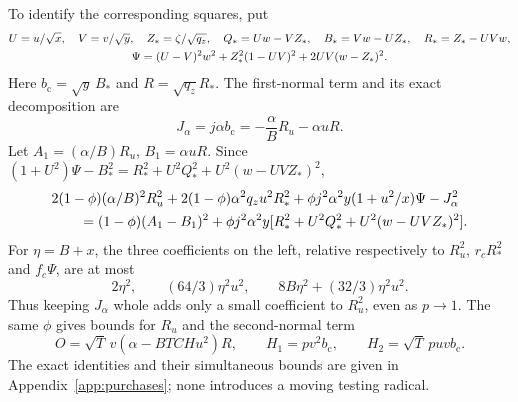 \documentclass[10pt]{article}
\newcommand{\bc}{b_{\mathrm c}}
\newcommand{\Zc}{Z_*}
\newcommand{\Qh}{Q_*}
\newcommand{\Rh}{R_*}
\newcommand{\Bh}{B_*}
\newcommand{\Ps}{\Psi}
\begin{document}
To identify the corresponding squares, put
\begin{gather}
 U=u/\sqrt x,\quad V=v/\sqrt y,\quad \Zc=\zeta/\sqrt{q_z},\quad
 \Qh=Uw-V\Zc,\quad \Bh=Vw-U\Zc,\quad\Rh=\Zc-UVw,\notag\\
 \Ps=(U-V)^2w^2+\Zc^2(1-UV)^2+2UV(w-\Zc)^2 .
 \label{eq:circuit}
\end{gather}
Here $\bc=\sqrt y\,\Bh$ and $R=\sqrt{q_z}\Rh$.
The first-normal term and its exact decomposition are
\begin{equation}
 J_\alpha=j\alpha\bc=-\frac{\alpha}{B}R_u-\alpha uR .
 \label{eq:J}
\end{equation}
Let $A_1=(\alpha/B)R_u$, $B_1=\alpha uR$. Since
$(1+U^2)\Ps-\Bh^2=\Rh^2+U^2\Qh^2+U^2(w-UV\Zc)^2$,
\begin{align}
 &2(1-\phi)(\alpha/B)^2R_u^2
 +2(1-\phi)\alpha^2q_zu^2\Rh^2
 +\phi j^2\alpha^2y(1+u^2/x)\Ps-J_\alpha^2 \notag\\
 &\qquad=(1-\phi)(A_1-B_1)^2
 +\phi j^2\alpha^2y[\Rh^2+U^2\Qh^2+U^2(w-UV\Zc)^2].
 \label{eq:Jpurchase}
\end{align}
For $\eta=B+x$, the three coefficients on the left, relative respectively to
$R_u^2$, $r_c\Rh^2$ and $f_c\Ps$, are at most
\[
 2\eta^2,\qquad (64/3)\eta^2u^2,\qquad
 8B\eta^2+(32/3)\eta^2u^2 .
\]
Thus keeping $J_\alpha$ whole adds only a small coefficient to
$R_u^2$, even as $p\to1$. The same $\phi$ gives bounds for $R_u$ and the second-normal
term
\begin{equation}
 O=\sqrt T\,v(\alpha-BTCHu^2)R,\qquad
 H_1=pv^2\bc,\qquad H_2=\sqrt T\,puv\bc .
 \label{eq:helpers}
\end{equation}
The exact identities and their simultaneous bounds are given in
Appendix~\ref{app:purchases}; none introduces a moving testing radical.
\end{document}
